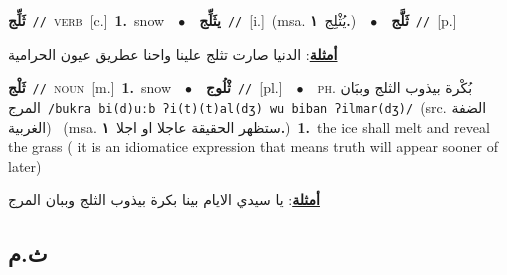 \documentclass[10pt,a4paper,twoside]{article} %
\begin{document}
\begin{multicols}{2}
{{{{{{{{{{\setlength\topsep{0pt}\textbf{\foreignlanguage{arabic}{ثَلِّج}}\ {\color{gray}\texttt{//}\color{black}}\ \textsc{verb}\ [c.]\ \textbf{1.}~snow\ \ $\bullet$\ \ \setlength\topsep{0pt}\textbf{\foreignlanguage{arabic}{يثَلِّج}}\ {\color{gray}\texttt{//}\color{black}}\ [i.]\ \color{gray}(msa. \foreignlanguage{arabic}{يُثْلِج}~\foreignlanguage{arabic}{\textbf{١.}})\color{black}\ \ $\bullet$\ \ \setlength\topsep{0pt}\textbf{\foreignlanguage{arabic}{ثَلَّج}}\ {\color{gray}\texttt{//}\color{black}}\ [p.]\  \begin{flushright}\color{gray}\foreignlanguage{arabic}{\textbf{\underline{\foreignlanguage{arabic}{أمثلة}}}: الدنيا صارت تثلج علينا واحنا عطريق عيون الحرامية}\end{flushright}\color{black}} \vspace{2mm}

{\setlength\topsep{0pt}\textbf{\foreignlanguage{arabic}{ثَلْج}}\ {\color{gray}\texttt{//}\color{black}}\ \textsc{noun}\ [m.]\ \textbf{1.}~snow\ \ $\bullet$\ \ \setlength\topsep{0pt}\textbf{\foreignlanguage{arabic}{ثْلُوج}}\ {\color{gray}\texttt{//}\color{black}}\ [pl.]\ \ $\bullet$\ \ \textsc{ph.} \color{gray} \foreignlanguage{arabic}{بُكْرة بيذوب الثلج وببَان المرج}\color{black}\ {\color{gray}\texttt{/{\sffamily bukra bi(d)uːb ʔi(t)(t)al(dʒ) wu biban ʔilmar(dʒ)}/}\color{black}}\ \color{gray}(src. \foreignlanguage{arabic}{الضفة الغربية})\color{black}\ \color{gray} (msa. \foreignlanguage{arabic}{ستظهر الحقيقة عاجلا او اجلا}~\foreignlanguage{arabic}{\textbf{١.}})\color{black}\ \textbf{1.}~the ice shall melt and reveal the grass ( it is an idiomatice expression that means truth will appear sooner of later)\  \begin{flushright}\color{gray}\foreignlanguage{arabic}{\textbf{\underline{\foreignlanguage{arabic}{أمثلة}}}: يا سيدي الايام بينا بكرة بيذوب الثلج وببان المرج}\end{flushright}\color{black}} \vspace{2mm}

\vspace{-3mm}
\subsection*{\color{blue}\foreignlanguage{arabic}{ث.م}\color{blue}{ (ntws)}} 

}}}}}}}}}
\end{multicols}
\end{document}
